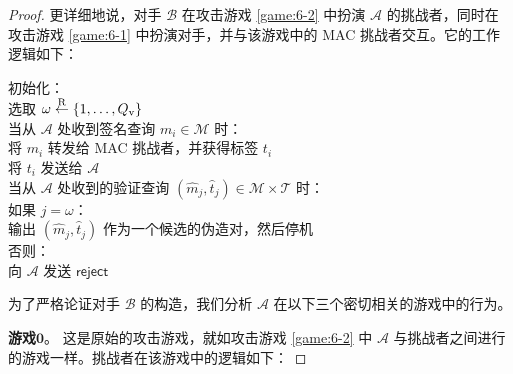 \begin{proof}
更详细地说，对手 $\mathcal{B}$ 在攻击游戏 \ref{game:6-2} 中扮演 $\mathcal{A}$ 的挑战者，同时在攻击游戏 \ref{game:6-1} 中扮演对手，并与该游戏中的 MAC 挑战者交互。它的工作逻辑如下：

\vspace{5pt}

\hspace*{5pt} 初始化：\\
\hspace*{50pt} 选取 $\omega\overset{\rm R}\leftarrow\{1,\dots,Q_{\rm v}\}$\\
\hspace*{26pt} 当从 $\mathcal{A}$ 处收到签名查询 $m_i\in\mathcal{M}$ 时：\\
\hspace*{50pt} 将 $m_i$ 转发给 MAC 挑战者，并获得标签 $t_i$\\
\hspace*{50pt} 将 $t_i$ 发送给 $\mathcal{A}$\\
\hspace*{26pt} 当从 $\mathcal{A}$ 处收到的验证查询 $(\hat m_j,\hat t_j)\in\mathcal{M}\times\mathcal{T}$ 时：\\
\hspace*{50pt} 如果 $j=\omega$：\\
\hspace*{75pt} 输出 $(\hat m_j,\hat t_j)$ 作为一个候选的伪造对，然后停机\\
\hspace*{50pt} 否则：\\
\hspace*{75pt} 向 $\mathcal{A}$ 发送 $\mathsf{reject}$

\vspace{5pt}

为了严格论证对手 $\mathcal{B}$ 的构造，我们分析 $\mathcal{A}$ 在以下三个密切相关的游戏中的行为。

\vspace{5pt}

\noindent\textbf{游戏$\mathbf{0}$}。
这是原始的攻击游戏，就如攻击游戏 \ref{game:6-2} 中 $\mathcal{A}$ 与挑战者之间进行的游戏一样。挑战者在该游戏中的逻辑如下：

\vspace{5pt}


\end{proof}
